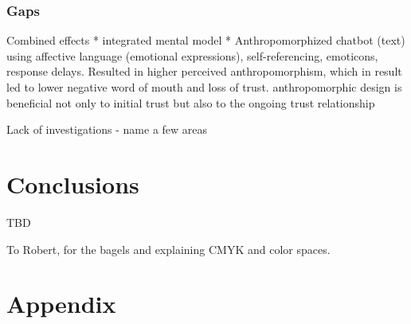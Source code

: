\documentclass[sigconf,screen,review, anonymous]{acmart}
\newcommand{\cmt}[1]{}%
\begin{document}




\subsubsection{Gaps}

Combined effects
* integrated mental model \cite{knijnenburg2016inferring}\cmt{[34]}
* Anthropomorphized chatbot (text) using affective language (emotional expressions), self-referencing, emoticons, response delays. Resulted in higher perceived anthropomorphism, which in result led to lower negative word of mouth and loss of trust. anthropomorphic design is beneficial not only to initial trust but also to the ongoing trust relationship \cite{seeger2021chatbots}\cmt{[35]}

Lack of investigations - name a few areas




\section{Conclusions}

TBD


\begin{acks}
To Robert, for the bagels and explaining CMYK and color spaces.
\end{acks}









\appendix

\onecolumn
\section{Appendix}
\end{document}
